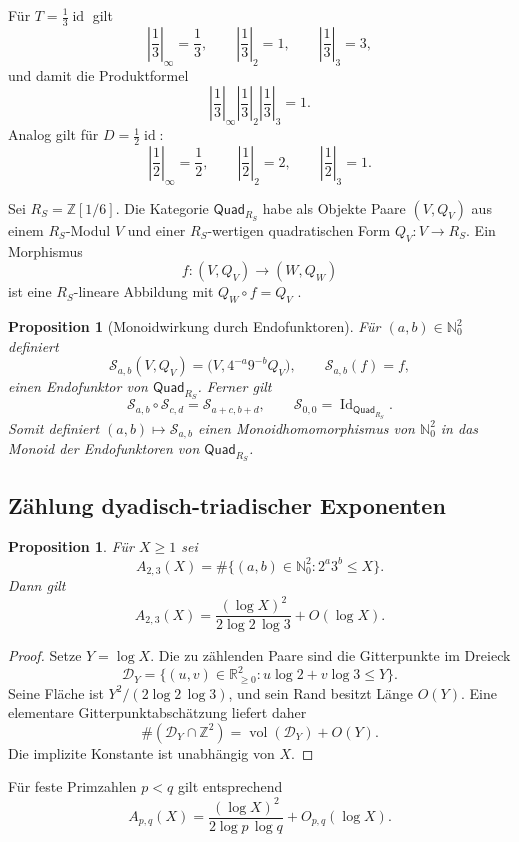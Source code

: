 \documentclass[11pt,a4paper]{article}
\newtheorem{proposition}[theorem]{Proposition}
\newcommand{\id}{\operatorname{id}}
\begin{document}
Für $T=\tfrac13\id$ gilt
\[
\left|\frac13\right|_\infty=\frac13,\qquad
\left|\frac13\right|_2=1,\qquad
\left|\frac13\right|_3=3,
\]
und damit die Produktformel
\[
\left|\frac13\right|_\infty\left|\frac13\right|_2\left|\frac13\right|_3=1.
\]
Analog gilt für $D=\tfrac12\id$:
\[
\left|\frac12\right|_\infty=\frac12,\qquad
\left|\frac12\right|_2=2,\qquad
\left|\frac12\right|_3=1.
\]

Sei $R_S=\mathbb{Z}[1/6]$. Die Kategorie $\mathsf{Quad}_{R_S}$ habe als Objekte Paare $(V,Q_V)$ aus einem $R_S$-Modul $V$ und einer $R_S$-wertigen quadratischen Form $Q_V:V\to R_S$. Ein Morphismus
\[
f:(V,Q_V)\longrightarrow(W,Q_W)
\]
ist eine $R_S$-lineare Abbildung mit $Q_W\circ f=Q_V$ \cite{cassels}.

\begin{proposition}[Monoidwirkung durch Endofunktoren]
Für $(a,b)\in\mathbb{N}_0^2$ definiert
\[
\mathscr{S}_{a,b}(V,Q_V)=\bigl(V,4^{-a}9^{-b}Q_V\bigr),\qquad \mathscr{S}_{a,b}(f)=f,
\]
einen Endofunktor von $\mathsf{Quad}_{R_S}$. Ferner gilt
\[
\mathscr{S}_{a,b}\circ\mathscr{S}_{c,d}=\mathscr{S}_{a+c,b+d},\qquad \mathscr{S}_{0,0}=\operatorname{Id}_{\mathsf{Quad}_{R_S}}.
\]
Somit definiert $(a,b)\mapsto\mathscr{S}_{a,b}$ einen Monoidhomomorphismus von $\mathbb{N}_0^2$ in das Monoid der Endofunktoren von $\mathsf{Quad}_{R_S}$.
\end{proposition}

\subsection{Zählung dyadisch-triadischer Exponenten}
\begin{proposition}
Für $X\ge1$ sei
\[
A_{2,3}(X)=\#\{(a,b)\in\mathbb{N}_0^2:2^a3^b\le X\}.
\]
Dann gilt
\[
A_{2,3}(X)=\frac{(\log X)^2}{2\log2\,\log3}+O(\log X).
\]
\end{proposition}

\begin{proof}
Setze $Y=\log X$. Die zu zählenden Paare sind die Gitterpunkte im Dreieck
\[
\mathcal{D}_Y=\{(u,v)\in\mathbb{R}_{\ge0}^2:u\log2+v\log3\le Y\}.
\]
Seine Fläche ist $Y^2/(2\log2\,\log3)$, und sein Rand besitzt Länge $O(Y)$. Eine elementare Gitterpunktabschätzung liefert daher
\[
\#(\mathcal{D}_Y\cap\mathbb{Z}^2)=\operatorname{vol}(\mathcal{D}_Y)+O(Y).
\]
Die implizite Konstante ist unabhängig von $X$.
\end{proof}

Für feste Primzahlen $p<q$ gilt entsprechend
\[
A_{p,q}(X)=\frac{(\log X)^2}{2\log p\,\log q}+O_{p,q}(\log X).
\]
\end{document}
